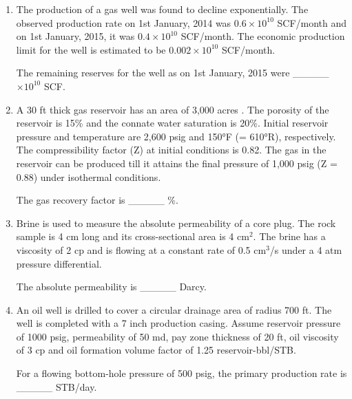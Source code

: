 \documentclass[journal]{IEEEtran}
\begin{document}
\begin{enumerate}
    \hfill{}
    
    \item The production of a gas well was found to decline exponentially. The observed production rate on 1st January, 2014 was $0.6\times10^{10}$ SCF/month and on 1st January, 2015, it was $0.4\times10^{10}$ SCF/month. The economic production limit for the well is estimated to be $0.002\times10^{10}$ SCF/month.
    
    The remaining reserves for the well as on 1st January, 2015 were \_\_\_\_\_ $\times 10^{10}$ SCF.
    
    \hfill{}
    
    \item A 30 ft thick gas reservoir has an area of 3,000 acres . The porosity of the reservoir is 15\% and the connate water saturation is 20\%. Initial reservoir pressure and temperature are 2,600 psig and 150°F (= 610°R), respectively. The compressibility factor (Z) at initial conditions is 0.82. The gas in the reservoir can be produced till it attains the final pressure of 1,000 psig (Z = 0.88) under isothermal conditions.
    
    The gas recovery factor is \_\_\_\_\_ \%.
    
    \hfill{}
    
    \item Brine is used to measure the absolute permeability of a core plug. The rock sample is 4 cm long and its cross-sectional area is 4 cm$^2$. The brine has a viscosity of 2 cp and is flowing at a constant rate of 0.5 cm$^3$/s under a 4 atm pressure differential.
    
    The absolute permeability is \_\_\_\_\_ Darcy.
    
    \hfill{}
    
    \item An oil well is drilled to cover a circular drainage area of radius 700 ft. The well is completed with a 7 inch production casing. Assume reservoir pressure of 1000 psig, permeability of 50 md, pay zone thickness of 20 ft, oil viscosity of 3 cp and oil formation volume factor of 1.25 reservoir-bbl/STB.
    
    For a flowing bottom-hole pressure of 500 psig, the primary production rate is \_\_\_\_\_ STB/day.
    
    \hfill{}
    

\end{enumerate}
\end{document}
